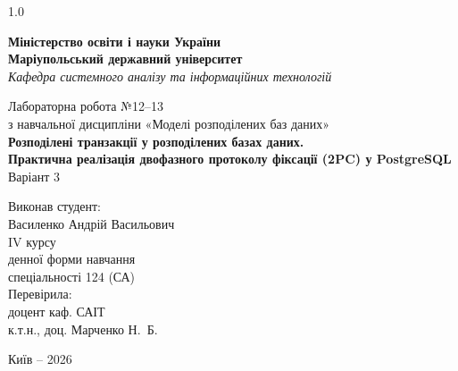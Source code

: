 \newcommand{\university}{Маріупольський державний університет}
\newcommand{\department}{Кафедра системного аналізу та інформаційних технологій}
\newcommand{\discipline}{Моделі розподілених баз даних}
\newcommand{\worktitle}{Розподілені транзакції у розподілених базах даних}
\newcommand{\worksubtitle}{Практична реалізація двофазного протоколу фіксації (2PC) у PostgreSQL}
\newcommand{\variant}{Варіант 3}
\newcommand{\student}{Василенко Андрій Васильович}
\newcommand{\specialty}{спеціальності 124 (СА)}
\newcommand{\teacher}{к.т.н., доц. Марченко Н.~Б.}
\newcommand{\cityyear}{Київ -- 2026}

\begin{titlepage}
    \begin{spacing}{1.0}
    \thispagestyle{empty}
    \setlength{\parindent}{0pt}

    \begin{center}
        \textbf{Міністерство освіти і науки України}\\
        \textbf{\university}\\[0.8em]
        \textit{\department}
    \end{center}

    \vspace*{4.0cm}

    \begin{center}
        Лабораторна робота №12--13\\[0.5em]
        з навчальної дисципліни «\discipline»\\[0.6em]
        \textbf{\worktitle.}\\[0.35em]
        \textbf{\worksubtitle}\\[0.6em]
        \variant
    \end{center}

    \vspace*{2.2cm}

    \hfill
    \begin{minipage}{0.47\textwidth}
        Виконав студент:\\[0.5em]
        \student\\[0.5em]
        IV курсу\\[0.5em]
        денної форми навчання\\[0.5em]
        \specialty\\[2em]

        Перевірила:\\[0.5em]
        доцент каф. САІТ\\[0.5em]
        \teacher
    \end{minipage}

    \vfill

    \begin{center}
        \cityyear
    \end{center}
    \end{spacing}
\end{titlepage}
